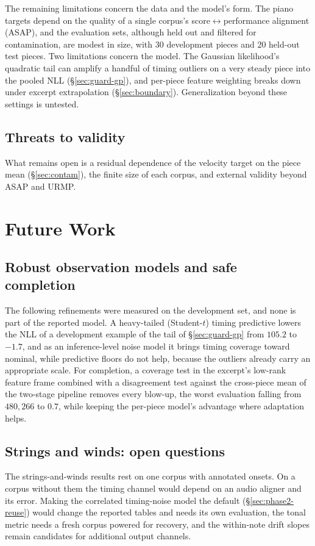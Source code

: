 \documentclass[11pt,a4paper]{report}
\begin{document}
The remaining limitations concern the data and the model's form. The piano
targets depend on the quality of a single corpus's
score$\leftrightarrow$performance alignment (ASAP), and the evaluation sets,
although held out and filtered for contamination, are modest in size, with
30 development pieces and 20 held-out test pieces. Two limitations concern
the model. The Gaussian likelihood's
quadratic tail can amplify a handful of timing outliers on a very steady
piece into the pooled NLL (\S\ref{sec:guard-gp}), and per-piece feature
weighting breaks down under excerpt extrapolation (\S\ref{sec:boundary}).
Generalization beyond these settings is untested.

\section{Threats to validity}
What remains open is a residual dependence of the velocity target on the
piece mean (\S\ref{sec:contam}), the finite size of each corpus, and
external validity beyond ASAP and URMP.


\chapter{Future Work}\label{ch:future}

\section{Robust observation models and safe completion}
The following refinements were measured on the development set, and none
is part of the reported model. A heavy-tailed
(Student-$t$) timing predictive lowers the NLL of a development example of
the tail of \S\ref{sec:guard-gp} from $105.2$ to $-1.7$, and as an
inference-level noise model it brings timing coverage toward nominal, while
predictive floors do not help, because the outliers already carry an
appropriate scale. For completion, a coverage test in the excerpt's
low-rank feature frame combined with a disagreement test against the
cross-piece mean of the two-stage pipeline removes every blow-up, the worst evaluation falling from
$480{,}266$ to $0.7$, while keeping the per-piece model's advantage where
adaptation helps.

\section{Strings and winds: open questions}
The strings-and-winds results rest on one corpus with annotated onsets. On
a corpus without them the timing channel would depend on an audio aligner
and its error. Making the correlated timing-noise model the default
(\S\ref{sec:phase2-reuse}) would change the reported tables and needs its
own evaluation, the tonal metric needs a fresh corpus powered for recovery,
and the within-note drift slopes remain candidates for additional output
channels.
\end{document}
